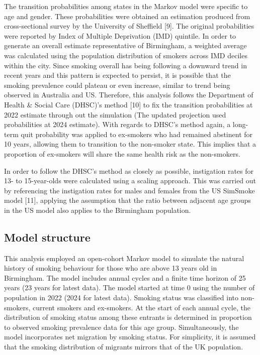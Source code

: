 \documentclass[
  letterpaper,
  DIV=11,
  numbers=noendperiod]{scrartcl}
\begin{document}
The transition probabilities among states in the Markov model were
specific to age and gender. These probabilities were obtained an
estimation produced from cross-sectional survey by the University of
Sheffield {[}9{]}. The original probabilities were reported by Index of
Multiple Deprivation (IMD) quintile. In order to generate an overall
estimate representative of Birmingham, a weighted average was calculated
using the population distribution of smokers across IMD deciles within
the city. Since smoking overall has being following a downward trend in
recent years and this pattern is expected to persist, it is possible
that the smoking prevalence could plateau or even increase, similar to
trend being observed in Australia and US. Therefore, this analysis
follows the Department of Health \& Social Care (DHSC)'s method {[}10{]}
to fix the transition probabilities at 2022 estimate through out the
simulation {(The updated projection used probabilities at 2024
estimate).} With regards to DHSC's method again, a long-term quit
probability was applied to ex-smokers who had remained abstinent for 10
years, allowing them to transition to the non-smoker state. This implies
that a proportion of ex-smokers will share the same health risk as the
non-smokers.

In order to follow the DHSC's method as closely as possible, instigation
rates for 13- to 15-year-olds were calculated using a scaling approach.
This was carried out by referencing the instigation rates for males and
females from the US SimSmoke model {[}11{]}, applying the assumption
that the ratio between adjacent age groups in the US model also applies
to the Birmingham population.

\subsection{Model structure}\label{model-structure}

This analysis employed an open-cohort Markov model to simulate the
natural history of smoking behaviour for those who are above 13 years
old in Birmingham. The model includes annual cycles and a finite time
horizon of 25 years {(23 years for latest data)}. The model started at
time 0 using the number of population in 2022 {(2024 for latest data)}.
Smoking status was classified into non-smokers, current smokers and
ex-smokers. At the start of each annual cycle, the distribution of
smoking status among these entrants is determined in proportion to
observed smoking prevalence data for this age group. Simultaneously, the
model incorporates net migration by smoking status. For simplicity, it
is assumed that the smoking distribution of migrants mirrors that of the
UK population.
\end{document}
